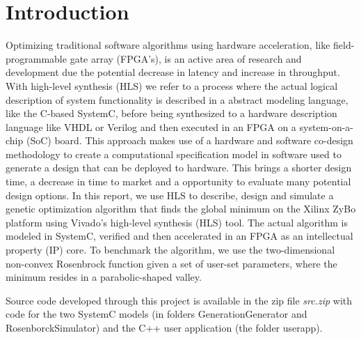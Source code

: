 \section{Introduction}
Optimizing traditional software algorithms using hardware acceleration, like field-programmable gate array (FPGA's), is an active area of research and development due the potential decrease in latency and increase in throughput. With high-level synthesis (HLS) we refer to a process where the actual logical description of system functionality is described in a abstract modeling language, like the C-based SystemC, before being synthesized to a hardware description language like VHDL or Verilog and then executed in an FPGA on a system-on-a-chip (SoC) board. This approach makes use of a hardware and software co-design methodology to create a computational specification model in software used to generate a design that can be deployed to hardware. This brings a shorter design time, a decrease in time to market and a opportunity to evaluate many potential design options. In this report, we use HLS to describe, design and simulate a genetic optimization algorithm that finds the global minimum on the Xilinx ZyBo platform using Vivado's high-level synthesis (HLS) tool. The actual algorithm is modeled in SystemC, verified and then accelerated in an FPGA as an intellectual property (IP) core. To benchmark the algorithm, we use the two-dimensional non-convex Rosenbrock function\cite{Shang2006} given a set of user-set parameters, where the minimum resides in a parabolic-shaped valley.

Source code developed through this project is available in the zip file \textit{src.zip} with code for the two SystemC models (in folders GenerationGenerator and RosenborckSimulator) and the C++ user application (the folder userapp).